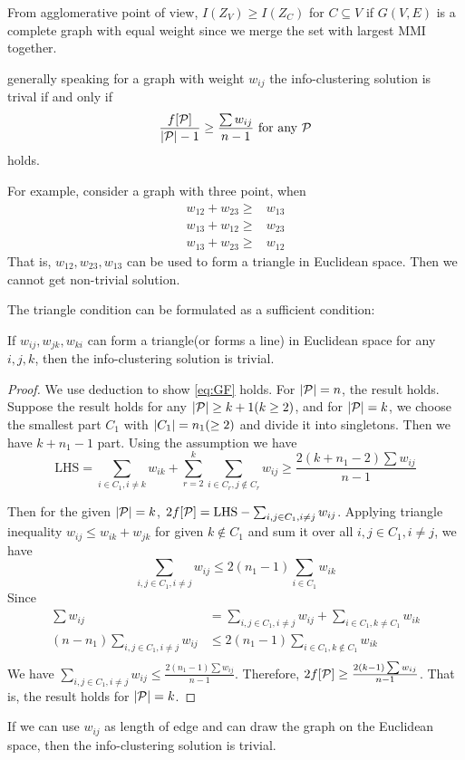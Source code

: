 \documentclass{article}
\begin{document}
From agglomerative point of view, $I(Z_V) \geq I(Z_C)$ for $C\subseteq V$ if $G(V, E)$ is a complete graph with equal weight since we merge the set with largest MMI together.

generally speaking for a graph with weight $w_{ij}$ the info-clustering solution is trival if and only if
\begin{equation}\label{eq:GF}
\frac{f[\P]}{\abs{\P}-1} \geq \frac{\sum w_{ij}}{n-1} \textrm{ for any } \P
\end{equation}
holds.

For example, consider a graph with three point, when 
\begin{align*}
w_{12}+w_{23}\geq & w_{13} \\
w_{13}+w_{12}\geq & w_{23} \\
w_{13}+w_{23}\geq & w_{12} 
\end{align*}
That is, $w_{12}, w_{23}, w_{13}$ can be used to form a triangle in Euclidean space. Then we cannot get non-trivial solution.

The triangle condition can be formulated as a sufficient condition:
\begin{lemma}
If $w_{ij}, w_{jk}, w_{ki}$ can form a triangle(or forms a line) in Euclidean space for any $i, j, k$, then the info-clustering solution is trivial.
\end{lemma}
\begin{proof}
We use deduction to show  \eqref{eq:GF} holds. For $\abs{\P}=n$, the result holds. Suppose the result holds for any $\abs{\P} \geq k+1(k\geq 2)$, and for $\abs{\P}=k$, we choose the smallest part $C_1$ with $\abs{C_1}=n_1(\geq 2)$ and divide it into singletons. Then we have $k+n_1-1$ part. Using the assumption we have
$$
\mathrm{LHS} = \sum_{i\in C_1, i\neq k} w_{ik} + \sum_{r=2}^k \sum_{i \in C_r, j \not\in C_r} w_{ij}\geq \frac{2(k+n_1 -2)\sum w_{ij}}{n-1}
$$

Then for the given $\abs{\P}=k$, $2f[\P] =\mathrm{LHS} - \sum_{i,j\in C_1, i\neq j} w_{ij}$.
Applying triangle inequality $w_{ij} \leq w_{ik} + w_{jk}$ for given $k\not\in C_1$ and sum it over all $i, j \in C_1, i\neq j$, we have
$$
\sum_{i,j \in C_1, i\neq j} w_{ij} \leq 2(n_1-1)\sum_{i\in C_1} w_{ik}
$$
Since
\begin{align*}
\sum w_{ij} &= \sum_{i,j \in C_1, i\neq j} w_{ij} + \sum_{i\in C_1, k\neq C_1} w_{ik} \\
(n - n_1) \sum_{i,j \in C_1, i\neq j} w_{ij}& \leq 2(n_1 - 1) \sum_{i \in C_1, k \not\in C_1} w_{ik} \\
\end{align*}
We have $\sum_{i,j \in C_1, i\neq j} w_{ij} \leq \frac{2(n_1-1) \sum w_{ij}}{n-1}$. Therefore, 
$2f[\P] \geq \frac{2(k-1) \sum w_{ij}}{n-1}$. That is, the result holds for $\abs{\P}=k$.
\end{proof}
If we can use $w_{ij}$ as length of edge and can draw the graph on the Euclidean space, then the info-clustering solution is trivial.
\end{document}
